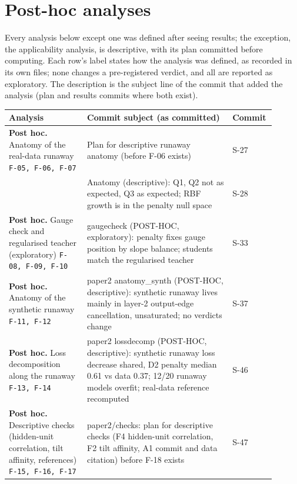\section{Post-hoc analyses}\label{app:posthoc}

Every analysis below except one was defined after seeing results; the exception, the applicability analysis, is descriptive, with its plan committed before computing. Each row's label states how the analysis was defined, as recorded in its own files; none changes a pre-registered verdict, and all are reported as exploratory. The description is the subject line of the commit that added the analysis (plan and results commits where both exist).

{\footnotesize\setlength{\tabcolsep}{3pt}\begin{longtable}{R{0.28\linewidth} R{0.52\linewidth} R{0.10\linewidth}}
\toprule
Analysis & Commit subject (as committed) & Commit \\
\midrule
\endhead
\textbf{Post hoc.} Anatomy of the real-data runaway \newline \footnotesize{\texttt{F-05, F-06, F-07}} & Plan for descriptive runaway anatomy (before F-06 exists) & S-27 \\
 & Anatomy (descriptive): Q1, Q2 not as expected, Q3 as expected; RBF growth is in the penalty null space & S-28 \\
\textbf{Post hoc.} Gauge check and regularised teacher (exploratory) \newline \footnotesize{\texttt{F-08, F-09, F-10}} & gaugecheck (POST-HOC, exploratory): penalty fixes gauge position by slope balance; students match the regularised teacher & S-33 \\
\textbf{Post hoc.} Anatomy of the synthetic runaway \newline \footnotesize{\texttt{F-11, F-12}} & paper2 anatomy\_synth (POST-HOC, descriptive): synthetic runaway lives mainly in layer-2 output-edge cancellation, unsaturated; no verdicts change & S-37 \\
\textbf{Post hoc.} Loss decomposition along the runaway \newline \footnotesize{\texttt{F-13, F-14}} & paper2 lossdecomp (POST-HOC, descriptive): synthetic runaway loss decrease shared, D2 penalty median 0.61 vs data 0.37; 12/20 runaway models overfit; real-data reference recomputed & S-46 \\
\textbf{Post hoc.} Descriptive checks (hidden-unit correlation, tilt affinity, references) \newline \footnotesize{\texttt{F-15, F-16, F-17}} & paper2/checks: plan for descriptive checks (F4 hidden-unit correlation, F2 tilt affinity, A1 commit and data citation) before F-18 exists & S-47 \\

\end{longtable}}
